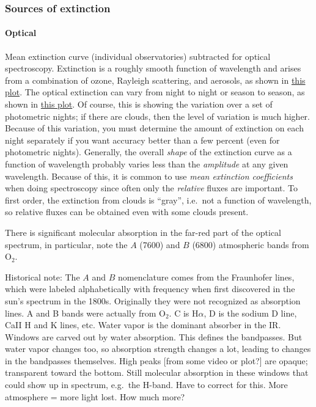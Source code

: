 \documentclass[12pt]{article}
\newcommand{\mynotes}[1]{\textcolor{myBlue}{#1}}
\begin{document}
\subsubsection{Sources of extinction}
\paragraph{Optical}
\mynotes{ Mean extinction curve (individual observatories) subtracted for optical
    spectroscopy.}
Extinction is a roughly smooth function of
wavelength and arises from a combination of ozone, Rayleigh scattering, and
aerosols, as shown in \href{http://astronomy.nmsu.edu/holtz/a535/html/diagrams/a535/extinct.htm}
{this plot}. The optical extinction can vary from night to night or season to
season, as shown in \href{http://astronomy.nmsu.edu/holtz/a535/html/diagrams/a535/tauvar.htm}
{this plot}. Of course, this is showing the variation over a set of photometric
nights; if there are clouds, then the level of variation is much higher.
Because of this variation, you must determine the amount of extinction on each
night separately if you want accuracy better than a few percent (even for
photometric nights). Generally, the overall \emph{shape} of the extinction curve as a
function of wavelength probably varies less than the \emph{amplitude} at any given
wavelength. Because of this, it is common to use \textit{mean extinction
coefficients} when doing spectroscopy since often only the \emph{relative}
fluxes are important. To first order, the extinction from clouds is ``gray'',
i.e.\ not a function of wavelength, so relative fluxes can be obtained even
with some clouds present.

There is significant molecular absorption in the far-red part of the
optical spectrum, in particular, note the $A$ (7600) and $B$ (6800) atmospheric
bands from O$_{2}$.

\mynotes{Historical note: The $A$ and $B$ nomenclature comes from the
Fraunhofer lines, which were labeled alphabetically with frequency when first
discovered in the sun's spectrum in the 1800s. Originally they were not
recognized as absorption lines. A and B bands were actually from O$_{2}$. C is
H$\alpha$, D is the sodium D line, CaII H and K lines, etc.}
\mynotes{ Water vapor is the dominant absorber in the IR\@.
    Windows are
    carved out by water absorption. This defines the bandpasses. But water
    vapor changes too, so absorption strength changes a lot, leading to changes
    in the bandpasses themselves. High peaks [from some video or plot?] are
    opaque; transparent toward the bottom. Still molecular absorption in these
    windows that could show up in spectrum, e.g.\ the H-band. Have to correct
    for this. More atmosphere = more light lost. How much more?}
\end{document}
